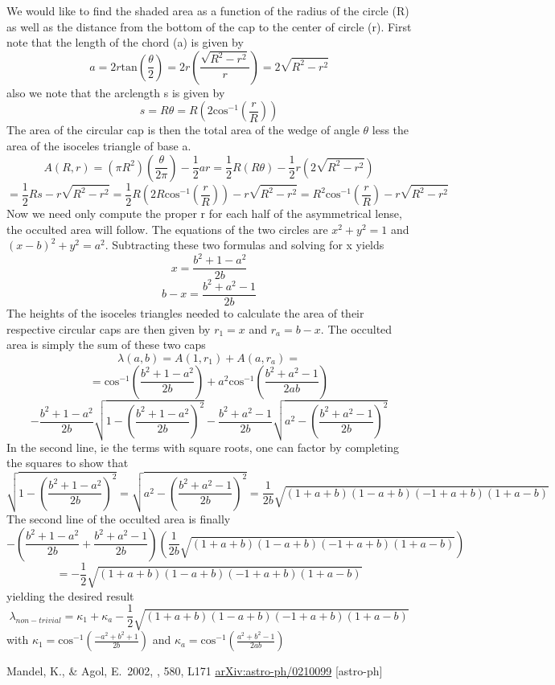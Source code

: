 \documentclass[12pt,preprint]{aastex}
\begin{document}
We would like to find the shaded area as a function of the radius of the circle (R) as well as the distance from the bottom of the cap to the center of circle (r).  First note that the length of the chord (a) is given by
\[
a = 2 r \mathrm{tan} \left( \frac{\theta}{2} \right) = 2 r \left( \frac{\sqrt{R^2 - r^2}}{r} \right) = 2 \sqrt{R^2 - r^2}
\]
also we note that the arclength s is given by
\[
s = R \theta = R \left( 2 \mathrm{cos}^{-1} \left( \frac{r}{R} \right) \right)
\]
The area of the circular cap is then the total area of the wedge of angle $\theta$ less the area of the isoceles triangle of base a. 
\[
A(R,r) = (\pi R^2) \left( \frac{\theta}{2 \pi} \right) - \frac{1}{2} a r = \frac{1}{2} R (R \theta) - \frac{1}{2} r ( 2 \sqrt{R^2 - r^2} ) 
\]
\[
 = \frac{1}{2} R s - r \sqrt{R^2 - r^2} = \frac{1}{2} R \left( 2 R \mathrm{cos}^{-1} \left( \frac{r}{R} \right) \right) - r \sqrt{R^2 - r^2} = R^2 \mathrm{cos}^{-1} \left( \frac{r}{R} \right) - r \sqrt{R^2 - r^2} 
\]
Now we need only compute the proper r for each half of the asymmetrical lense, the occulted area will follow. The equations of the two circles are $x^2 + y^2 = 1$ and $(x-b)^2 + y^2 = a^2$.  Subtracting these two formulas and solving for x yields
\[
x = \frac{b^2 + 1 - a^2}{2 b}
\]
\[
b - x = \frac{b^2 + a^2 -1}{2 b}
\]
The heights of the isoceles triangles needed to calculate the area of their respective circular caps are then given by $r_1 = x$ and $r_a = b-x$.  The occulted area is simply the sum of these two caps
\[
\lambda(a,b) = A(1,r_1) + A(a,r_a) = 
\]
\[
 = \mathrm{cos}^{-1} \left( \frac{b^2 + 1 - a^2}{2 b } \right) + a^2 \mathrm{cos}^{-1} \left( \frac{b^2 + a^2 - 1}{2 a b} \right) 
\]
\[
- \frac{b^2 + 1 - a^2}{2 b} \sqrt{1 - \left( \frac{b^2 + 1 - a^2}{2 b} \right)^2 } - \frac{b^2 + a^2 -1}{2 b} \sqrt{ a^2 - \left( \frac{b^2 + a^2 - 1}{2 b} \right)^2 }  
\]
In the second line, ie the terms with square roots, one can factor by completing the squares to show that
\[
\sqrt{1 - \left( \frac{b^2 + 1 - a^2}{2 b} \right)^2 } =  \sqrt{ a^2 - \left( \frac{b^2 + a^2 - 1}{2 b} \right)^2 } = \frac{1}{2 b} \sqrt{(1+a+b)(1-a+b)(-1+a+b)(1+a-b)} 
\]
The second line of the occulted area is finally
\[
- \left( \frac{b^2 +1 - a^2}{2 b} + \frac{b^2 + a^2 - 1}{2 b} \right) \left( \frac{1}{2 b} \sqrt{(1+a+b)(1-a+b)(-1+a+b)(1+a-b)} \right) 
\]
\[
 = - \frac{1}{2} \sqrt{(1+a+b)(1-a+b)(-1+a+b)(1+a-b)} 
\]
yielding the desired result
\[
\lambda_{non-trivial} = \kappa_1 + \kappa_a - \frac{1}{2} \sqrt{(1+a+b)(1-a+b)(-1+a+b)(1+a-b)} 
\]
with $\kappa_1 = \mathrm{cos}^{-1} \left( \frac{-a^2 + b^2 +1}{2 b} \right)$ and $\kappa_a = \mathrm{cos}^{-1} \left( \frac{a^2 + b^2 -1}{2 a b} \right)$ 
\newcommand{\arxiv}[1]{\href{http://arxiv.org/abs/#1}{arXiv:#1}}
\begin{thebibliography}{}\raggedright

        Mandel, K., \& Agol, E.\ 2002, \apjl, 580, L171
        \arxiv{astro-ph/0210099} [astro-ph]

\end{thebibliography}
\end{document}
